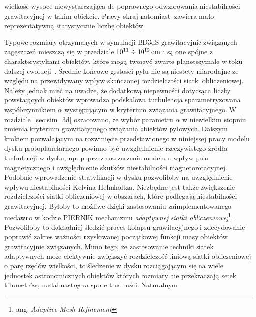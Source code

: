 wielkość wysoce niewystarczająca do poprawnego odwzorowania niestabilności
grawitacyjnej w takim obiekcie.  Prawy skraj natomiast, zawiera mało
reprezentatywną statystycznie liczbę obiektów.
%
\par Typowe rozmiary otrzymanych w symulacji BD3dS grawitacyjnie związanych
zagęszczeń mieszczą się w przedziale $10^{11} \div 10^{12}\hbox{$\thinspace\textrm{cm}$}$ i są one spójne z
charakterystykami obiektów, które mogą tworzyć zwarte planetezymale w toku
dalszej ewolucji~\cite{HS08}. Średnie końcowe gęstości pyłu nie są niestety
miarodajne ze względu na przewidywany wpływ skończonej rozdzielczości siatki
obliczeniowej. Należy jednak mieć na uwadze, że dodatkową niepewności dotycząca
liczby powstających obiektów wprowadza podskalowa turbulencja sparametryzowana
współczynnikiem $\alpha$ występującym w kryterium związania
grawitacyjnego.
W rozdziale~\ref{sec:sim_3d} oszacowano, że wybór parametru $\alpha$ w
niewielkim stopniu zmienia kryterium grawitacyjnego związania obiektów pyłowych.
Dalszym krokiem pozwalającym na rozwinięcie przedstawionego w niniejszej pracy
modelu dysku protoplanetarnego powinno być uwzględnienie rzeczywistego źródła
turbulencji w dysku, np. poprzez rozszerzenie modelu o wpływ pola magnetycznego
i uwzględnienie skutków niestabilności magnetorotacyjnej. Podobnie wprowadzenie
stratyfikacji w dysku pozwoliłoby na uwzględnienie wpływu niestabilności
Kelvina-Helmholtza.  Niezbędne jest także zwiększenie rozdzielczości siatki
obliczeniowej w obszarach, które podlegają niestabilności grawitacyjnej. Byłoby
to możliwe dzięki zastosowaniu zaimplementowanego niedawno w kodzie
\textsc{PIERNIK} mechanizmu \emph{adaptywnej siatki obliczeniowej}\footnote{ang.
\emph{Adaptive Mesh Refinement}}. Pozwoliłoby to dokładniej śledzić proces
kolapsu grawitacyjnego i zdecydowanie poprawić zakres ważności uzyskiwanej
początkowej funkcji masy obiektów grawitacyjnie związanych.  Mimo tego, że
zastosowanie techniki siatek adaptywnych może efektywnie zwiększyć rozdzielczość
liniową siatki obliczeniowej o parę rzędów wielkości, to śledzenie w dysku
rozciągającym się na wiele jednostek astronomicznych obiektów których rozmiary
nie przekraczają setek kilometrów, nadal nastręcza spore trudności.  Naturalnym
